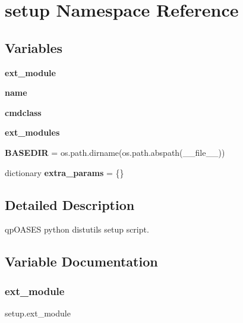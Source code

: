 \hypertarget{namespacesetup}{}\section{setup Namespace Reference}
\label{namespacesetup}
\subsection*{Variables}
\begin{DoxyCompactItemize}
\item 
{\bfseries ext\+\_\+module}
\item 
\mbox{\label{namespacesetup_ab3a7a0638d76a01367c5bc3cc699447f}} 
{\bfseries name}
\item 
\mbox{\label{namespacesetup_aa128e9ba397a7b5b03bb964c4d14268d}} 
{\bfseries cmdclass}
\item 
{\bfseries ext\+\_\+modules}
\item 
\mbox{\label{namespacesetup_a8268e9a7a88fe48a7afd64546d1ff029}} 
{\bfseries B\+A\+S\+E\+D\+IR} = os.\+path.\+dirname(os.\+path.\+abspath(\+\_\+\+\_\+file\+\_\+\+\_\+))
\item 
\mbox{\label{namespacesetup_a6194b21844083c8e7c88ac35201e8641}} 
dictionary {\bfseries extra\+\_\+params} = \{\}
\end{DoxyCompactItemize}


\subsection{Detailed Description}
\begin{DoxyVerb}qpOASES python distutils setup script.\end{DoxyVerb}
 

\subsection{Variable Documentation}
\mbox{\label{namespacesetup_a6414d6cc6bb58187a9b06fe7e0fdf3c5}} 
\subsubsection{\texorpdfstring{ext\+\_\+module}{ext\_module}}
{\footnotesize\ttfamily setup.\+ext\+\_\+module}

